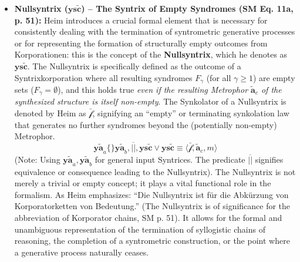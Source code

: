 \documentclass[12pt]{article}
\newcommand{\q}[1]{\enquote{#1}}
\newcommand{\syntrix}{\bm{y\widetilde{a}}}
\newcommand{\metrophor}{\bm{\widetilde{a}}}
\newcommand{\synkolator}{\mathcal{f}}
\newcommand{\synkolationsstufe}{m}
\newcommand{\syndrom}{F}
\newcommand{\nullsyntrix}{\bm{ys\widetilde{c}}}
\begin{document}
\begin{itemize}
    \item \textbf{Nullsyntrix (\( \nullsyntrix \)) – The Syntrix of Empty Syndromes (SM Eq. 11a, p. 51):}
    Heim introduces a crucial formal element that is necessary for consistently dealing with the termination of syntrometric generative processes or for representing the formation of structurally empty outcomes from Korporationen: this is the concept of the \textbf{Nullsyntrix}, which he denotes as \( \nullsyntrix \). The Nullsyntrix is specifically defined as the outcome of a Syntrixkorporation where all resulting syndromes \( \syndrom_\gamma \) (for all \( \gamma \geq 1 \)) are empty sets (\( \syndrom_\gamma = \emptyset \)), and this holds true \textit{even if the resulting Metrophor \( \metrophor_c \) of the synthesized structure is itself non-empty}. The Synkolator of a Nullsyntrix is denoted by Heim as \( \bar{\synkolator} \), signifying an \q{empty} or terminating synkolation law that generates no further syndromes beyond the (potentially non-empty) Metrophor.
    \begin{equation}
    \syntrix_a \{ \} \syntrix_b, \overline{||}, \nullsyntrix \vee \nullsyntrix \equiv \langle \bar{\synkolator}, \metrophor_c, \synkolationsstufe \rangle
    \label{eq:original_nullsyntrix}
    \end{equation}
    (Note: Using \( \syntrix_a, \syntrix_b \) for general input Syntrices. The predicate \( \overline{||} \) signifies equivalence or consequence leading to the Nullsyntrix). The Nullsyntrix is not merely a trivial or empty concept; it plays a vital functional role in the formalism. As Heim emphasizes: \q{Die Nullsyntrix ist für die Abkürzung von Korporatorketten von Bedeutung.} (The Nullsyntrix is of significance for the abbreviation of Korporator chains, SM p. 51). It allows for the formal and unambiguous representation of the termination of syllogistic chains of reasoning, the completion of a syntrometric construction, or the point where a generative process naturally ceases.


\end{itemize}
\end{document}
